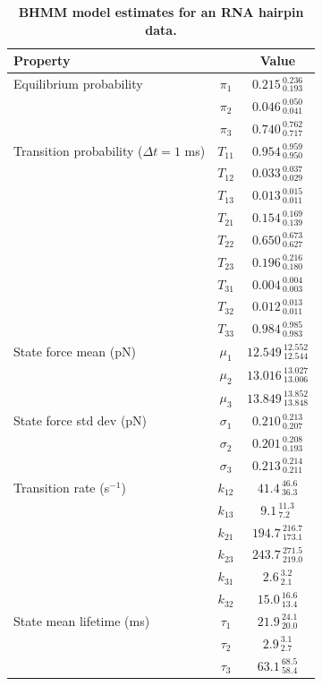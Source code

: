 \documentclass[aps,pre,twocolumn,superscriptaddress,nofootinbib,longbibliography]{revtex4-1}
\begin{document}
{\begin{table}
\caption{{\bf BHMM model estimates for %
{\color{red} an RNA} hairpin data.}
}
\label{table:p5ab-bhmm-confidence-intervals}
\begin{tabular*}{\columnwidth}{@{\extracolsep{\fill}}lcc}
\hline
\multicolumn{2}{l}{\bf Property} & \bf Value\\ \hline
Equilibrium probability & $\pi_{1}$ & $0.215_{\:0.193}^{\:0.236}$ \\
& $\pi_{2}$ & $0.046_{\:0.041}^{\:0.050}$ \\
& $\pi_{3}$ & $0.740_{\:0.717}^{\:0.762}$ \\
\hline
Transition probability ($\Delta t = 1$ ms) & $T_{11}$ & $0.954_{\:0.950}^{\:0.959}$ \\
& $T_{12}$ & $0.033_{\:0.029}^{\:0.037}$ \\
& $T_{13}$ & $0.013_{\:0.011}^{\:0.015}$ \\
& $T_{21}$ & $0.154_{\:0.139}^{\:0.169}$ \\
& $T_{22}$ & $0.650_{\:0.627}^{\:0.673}$ \\
& $T_{23}$ & $0.196_{\:0.180}^{\:0.216}$ \\
& $T_{31}$ & $0.004_{\:0.003}^{\:0.004}$ \\
& $T_{32}$ & $0.012_{\:0.011}^{\:0.013}$ \\
& $T_{33}$ & $0.984_{\:0.983}^{\:0.985}$ \\
\hline
State force mean (pN) & $\mu_{1}$ & $12.549_{\:12.544}^{\:12.552}$ \\
& $\mu_{2}$ & $13.016_{\:13.006}^{\:13.027}$ \\
& $\mu_{3}$ & $13.849_{\:13.848}^{\:13.852}$ \\
\hline
State force std dev (pN) & $\sigma_{1}$ & $0.210_{\:0.207}^{\:0.213}$ \\
& $\sigma_{2}$ & $0.201_{\:0.193}^{\:0.208}$ \\
& $\sigma_{3}$ & $0.213_{\:0.211}^{\:0.214}$ \\
\hline \hline
Transition rate (s$^{-1}$) & $k_{12}$ & $41.4_{\:36.3}^{\:46.6}$ \\
& $k_{13}$ & $9.1_{\:7.2}^{\:11.3}$ \\
& $k_{21}$ & $194.7_{\:173.1}^{\:216.7}$ \\
& $k_{23}$ & $243.7_{\:219.0}^{\:271.5}$ \\
& $k_{31}$ & $2.6_{\:2.1}^{\:3.2}$ \\
& $k_{32}$ & $15.0_{\:13.4}^{\:16.6}$ \\
\hline
State mean lifetime (ms) & $\tau_{1}$ & $21.9_{\:20.0}^{\:24.1}$ \\
& $\tau_{2}$ & $2.9_{\:2.7}^{\:3.1}$ \\
& $\tau_{3}$ & $63.1_{\:58.4}^{\:68.5}$ \\
\hline
\end{tabular*}
\end{table}

}
\end{document}
